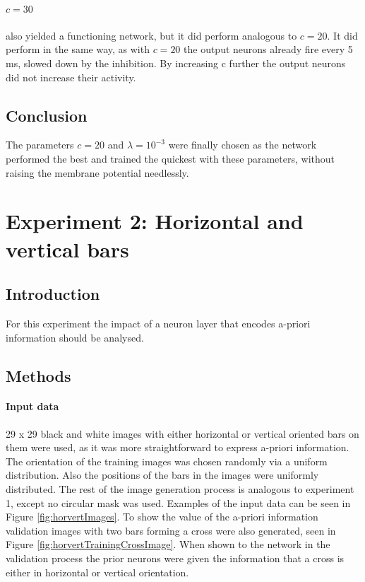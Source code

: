 \paragraph{$c = 30$}
also yielded a functioning network, but it did perform analogous to $c = 20$. It did perform in the same way, as with $c = 20$ the output neurons already fire every 5 ms, slowed down by the inhibition. By increasing c further the output neurons did not increase their activity.

\subsection{Conclusion}

The parameters $c = 20$ and $\lambda = 10^{-3}$ were finally chosen as the network performed the best and trained the quickest with these parameters, without raising the membrane potential needlessly.

\section{Experiment 2: Horizontal and vertical bars}
\label{section:horvert}

 \subsection{Introduction}

For this experiment the impact of a neuron layer that encodes a-priori information should be analysed.

\subsection{Methods}

\paragraph{Input data}
29 x 29 black and white images with either horizontal or vertical oriented bars on them were used, as it was more straightforward to express a-priori information. The orientation of the training images was chosen randomly via a uniform distribution. Also the positions of the bars in the images were uniformly distributed. The rest of the image generation process is analogous to experiment 1, except no circular mask was used. Examples of the input data can be seen in Figure \ref{fig:horvertImages}. To show the value of the a-priori information validation images with two bars forming a cross were also generated, seen in Figure \ref{fig:horvertTrainingCrossImage}. When shown to the network in the validation process the prior neurons were given the information that a cross is either in horizontal or vertical orientation.

